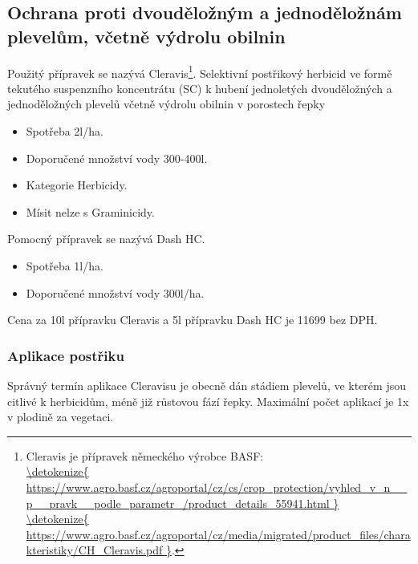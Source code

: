 \subsection{Ochrana proti dvouděložným a jednoděložnám plevelům, včetně výdrolu obilnin}
Použitý přípravek se nazývá Cleravis\footnote{Cleravis je přípravek německého výrobce BASF: \\\url{\detokenize{
https://www.agro.basf.cz/agroportal/cz/cs/crop_protection/vyhled_v_n__p__pravk__podle_parametr_/product_details_55941.html
}}
\\\url{\detokenize{
https://www.agro.basf.cz/agroportal/cz/media/migrated/product_files/charakteristiky/CH_Cleravis.pdf
}}.}.
Selektivní postřikový herbicid ve formě tekutého suspenzního koncentrátu (SC)
k hubení jednoletých dvouděložných a jednoděložných plevelů včetně výdrolu 
obilnin v porostech řepky
\begin{itemize}
  \item Spotřeba 2l/ha.
  \item Doporučené množství vody 300-400l.
  \item Kategorie Herbicidy.
  \item Mísit nelze s Graminicidy.
\end{itemize}
Pomocný přípravek se nazývá Dash HC.
\begin{itemize}
  \item Spotřeba 1l/ha.
  \item Doporučené množství vody 300l/ha.
\end{itemize}
Cena za 10l přípravku Cleravis a 5l přípravku Dash HC je 11699 bez DPH.

\subsubsection{Aplikace postřiku}
Správný termín aplikace Cleravisu je obecně 
dán stádiem plevelů, ve kterém jsou citlivé k herbicidům, méně již růstovou fází 
řepky.
Maximální počet aplikací je 1x v plodině za vegetaci.
